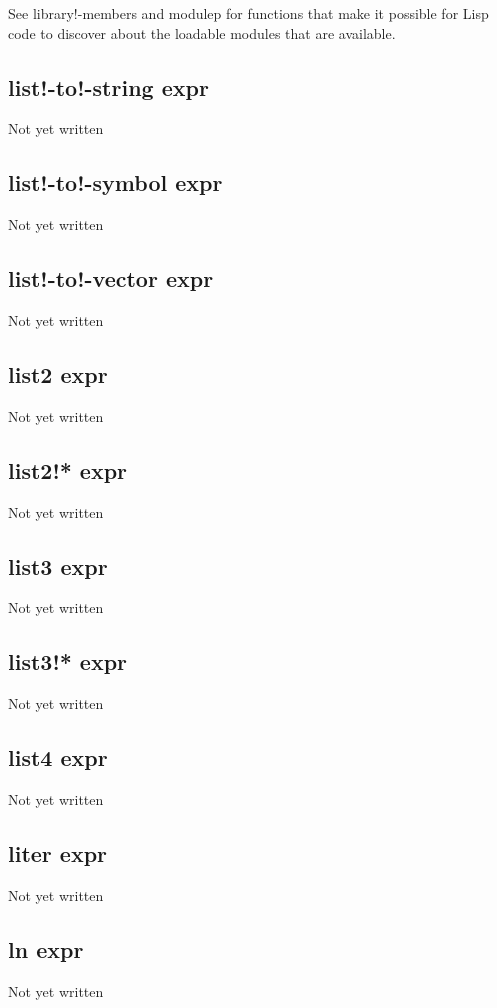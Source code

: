 \documentclass[a4paper,11pt]{article}
\begin{document}
See {\ttfamily library!-members} and {\ttfamily modulep} for functions that
make it possible for Lisp code to discover about the loadable modules that are
available.
\subsection{\ttfamily list!-to!-string expr}
Not yet written

\subsection{\ttfamily list!-to!-symbol expr}
Not yet written

\subsection{\ttfamily list!-to!-vector expr}
Not yet written

\subsection{\ttfamily list2 expr}
Not yet written

\subsection{\ttfamily list2!* expr}
Not yet written

\subsection{\ttfamily list3 expr}
Not yet written

\subsection{\ttfamily list3!* expr}
Not yet written

\subsection{\ttfamily list4 expr}
Not yet written

\subsection{\ttfamily liter expr}
Not yet written

\subsection{\ttfamily ln expr}
Not yet written
\end{document}
